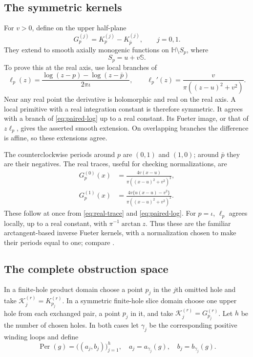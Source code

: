 \documentclass[11pt,a4paper]{article}
\numberwithin{equation}{section}
\theoremstyle{definition}
\theoremstyle{remark}
\newcommand{\HH}{\mathbb H}
\newcommand{\SSS}{\mathbb S}
\newcommand{\Per}{\operatorname{Per}}
\begin{document}
\subsection{The symmetric kernels}
For $v>0$, define on the upper half-plane
\begin{equation}\label{eq:G-definition}
 G_p^{(j)}=K_p^{(j)}-K_{\bar p}^{(j)},\qquad j=0,1.
\end{equation}
They extend to smooth axially monogenic functions on
$\HH\setminus S_p$, where
\[
 S_p=u+v\SSS.
\]
To prove this at the real axis, use local branches of
\begin{equation}\label{eq:paired-log}
 \ell_p(z)=\frac{\log(z-p)-\log(z-\bar p)}{2\pi\iota},\qquad
 \ell_p'(z)=\frac{v}{\pi((z-u)^2+v^2)}.
\end{equation}
Near any real point the derivative is holomorphic and real on the real axis.
A local primitive with a real integration constant is therefore symmetric.
It agrees with a branch of \eqref{eq:paired-log} up to a real constant. Its
Fueter image, or that of $z\ell_p$, gives the asserted smooth extension.
On overlapping branches the difference is affine, so these extensions agree.

The counterclockwise periods around $p$ are $(0,1)$ and $(1,0)$; around
$\bar p$ they are their negatives. The real traces, useful for checking
normalizations, are
\begin{align}
 G_p^{(0)}(x)&=\frac{4v(x-u)}{\pi((x-u)^2+v^2)^2},\label{eq:G0-real}\\
 G_p^{(1)}(x)&=\frac{4v\{u(x-u)-v^2\}}
                    {\pi((x-u)^2+v^2)^2}.\label{eq:G1-real}
\end{align}
These follow at once from \eqref{eq:real-trace} and \eqref{eq:paired-log}.
For $p=\iota$, $\ell_p$ agrees locally, up to a real constant, with
$\pi^{-1}\arctan z$. Thus these are the familiar arctangent-based inverse
Fueter kernels, with a normalization chosen to make their periods equal to
one; compare \cite[Example~2]{CPSS}.

\subsection{The complete obstruction space}
In a finite-hole product domain choose a point $p_j$ in the $j$th omitted hole
and take $\mathcal K_j^{(r)}=K_{p_j}^{(r)}$. In a symmetric finite-hole slice
domain choose one upper hole from each exchanged pair, a point $p_j$ in it,
and take $\mathcal K_j^{(r)}=G_{p_j}^{(r)}$. Let $h$ be the number of chosen
holes. In both cases let $\gamma_j$ be the corresponding positive winding
loops and define
\begin{equation}\label{eq:Per-finite}
 \Per(g)=\bigl((a_j,b_j)\bigr)_{j=1}^h,
 \quad a_j=a_{\gamma_j}(g),\quad b_j=b_{\gamma_j}(g).
\end{equation}
\end{document}
